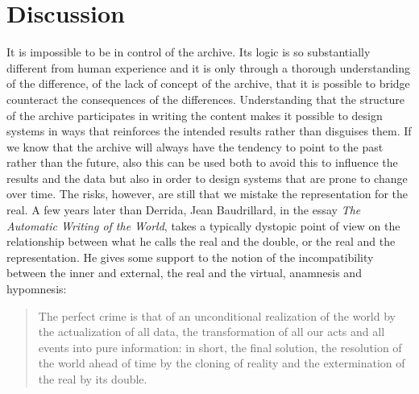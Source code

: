 \documentclass[11pt,a4paper]{article}
\begin{document}
\section*{Discussion}
\label{sec:discussion-1}

It is impossible to be in control of the archive. Its logic is so substantially different from human experience and it is only through a thorough understanding of the difference, of the lack of concept of the archive, that it is possible to bridge counteract the consequences of the differences. Understanding that the structure of the archive participates in writing the content makes it possible to design systems in ways that reinforces the intended results rather than disguises them. If we know that the archive will always have the tendency to point to the past rather than the future, also this can be used both to avoid this to influence the results and the data but also in order to design systems that are prone to change over time. The risks, however, are still that we mistake the representation for the real. A few years later than Derrida, Jean Baudrillard, in the essay \emph{The Automatic Writing of the World}, takes a typically dystopic point of view on the relationship between what he calls the real and the double, or the real and the representation. He gives some support to the notion of the incompatibility between the inner and external, the real and the virtual, anamnesis and hypomnesis:

\begin{quote}
  The perfect crime is that of an unconditional realization of the world by the actualization of all data, the transformation of all our acts and all events into pure information: in short, the final solution, the resolution of the world ahead of time by the cloning of reality and the extermination of the real by its double. \citep[p. 25]{baudrillard96}
\end{quote}
\end{document}
